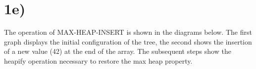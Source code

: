 \documentclass[a4paper,11pt]{article}
\begin{document}
\begin {center}

\end{center}

\section*{1e)}
The operation of MAX-HEAP-INSERT is shown in the diagrams below.
The first graph displays the initial configuration of the tree, 
the second shows the insertion of a new value (42) at the end of the
array.  The subsequent steps show the heapify operation necessary 
to restore the max heap property.
\end{document}
